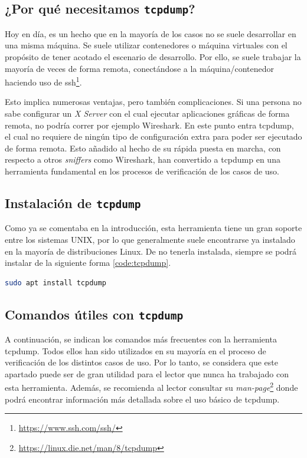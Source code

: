 \subsection{¿Por qué necesitamos \texttt{tcpdump}?}

Hoy en día, es un hecho que en la mayoría de los casos no se suele desarrollar en una misma máquina. Se suele utilizar contenedores o máquina virtuales con el propósito de tener acotado el escenario de desarrollo. Por ello, se suele trabajar la mayoría de veces de forma remota, conectándose a la máquina/contenedor haciendo uso de ssh\footnote{\url{https://www.ssh.com/ssh/}}.\\
\par

Esto implica numerosas ventajas, pero también complicaciones. Si una persona no sabe configurar un \textit{X Server} con el cual ejecutar aplicaciones gráficas de forma remota, no podría correr por ejemplo Wireshark. En este punto entra tcpdump, el cual no requiere de ningún tipo de configuración extra para poder ser ejecutado de forma remota. Esto añadido al hecho de su rápida puesta en marcha, con respecto a otros \textit{sniffers} como Wireshark, han convertido a tcpdump en una herramienta fundamental en los procesos de verificación de los casos de uso.

\subsection{Instalación de \texttt{tcpdump}}

Como ya se comentaba en la introducción, esta herramienta tiene un gran soporte entre los sistemas UNIX, por lo que generalmente suele encontrarse ya instalado en la mayoría de distribuciones Linux. De no tenerla instalada, siempre se podrá instalar de la siguiente forma \ref{code:tcpdump}.

\begin{lstlisting}[language= bash, style=Consola2, caption={Instalación de Tcpdump},label=code:tcpdump]
    sudo apt install tcpdump
\end{lstlisting}

\subsection{Comandos útiles con \texttt{tcpdump}}

A continuación, se indican los comandos más frecuentes con la herramienta tcpdump. Todos ellos han sido utilizados en su mayoría en el proceso de verificación de los distintos casos de uso. Por lo tanto, se considera que este apartado puede ser de gran utilidad para el lector que nunca ha trabajado con esta herramienta. Además, se recomienda al lector consultar su \textit{man-page}\footnote{\url{https://linux.die.net/man/8/tcpdump}} donde podrá encontrar información más detallada sobre el uso básico de tcpdump.

